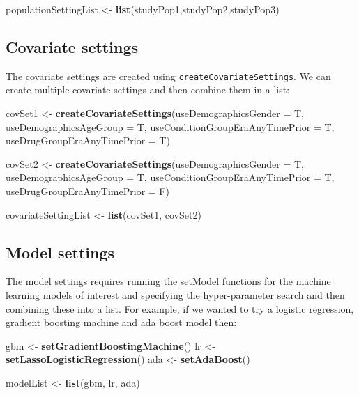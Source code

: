 \documentclass[]{article}
\newenvironment{Shaded}{\begin{snugshade}}{\end{snugshade}}
\newcommand{\KeywordTok}[1]{\textcolor[rgb]{0.13,0.29,0.53}{\textbf{#1}}}
\newcommand{\DataTypeTok}[1]{\textcolor[rgb]{0.13,0.29,0.53}{#1}}
\newcommand{\StringTok}[1]{\textcolor[rgb]{0.31,0.60,0.02}{#1}}
\newcommand{\NormalTok}[1]{#1}
\begin{document}
\begin{Shaded}
\begin{Highlighting}[]
\NormalTok{populationSettingList <-}\StringTok{ }\KeywordTok{list}\NormalTok{(studyPop1,studyPop2,studyPop3)}
\end{Highlighting}
\end{Shaded}

\subsection{Covariate settings}\label{covariate-settings}

The covariate settings are created using
\texttt{createCovariateSettings}. We can create multiple covariate
settings and then combine them in a list:

\begin{Shaded}
\begin{Highlighting}[]
\NormalTok{covSet1 <-}\StringTok{ }\KeywordTok{createCovariateSettings}\NormalTok{(}\DataTypeTok{useDemographicsGender =}\NormalTok{ T, }
                                   \DataTypeTok{useDemographicsAgeGroup =}\NormalTok{ T, }
                                   \DataTypeTok{useConditionGroupEraAnyTimePrior =}\NormalTok{ T,}
                                   \DataTypeTok{useDrugGroupEraAnyTimePrior =}\NormalTok{ T)}

\NormalTok{covSet2 <-}\StringTok{ }\KeywordTok{createCovariateSettings}\NormalTok{(}\DataTypeTok{useDemographicsGender =}\NormalTok{ T, }
                                   \DataTypeTok{useDemographicsAgeGroup =}\NormalTok{ T, }
                                   \DataTypeTok{useConditionGroupEraAnyTimePrior =}\NormalTok{ T,}
                                   \DataTypeTok{useDrugGroupEraAnyTimePrior =}\NormalTok{ F)}

\NormalTok{covariateSettingList <-}\StringTok{ }\KeywordTok{list}\NormalTok{(covSet1, covSet2)}
\end{Highlighting}
\end{Shaded}

\subsection{Model settings}\label{model-settings}

The model settings requires running the setModel functions for the
machine learning models of interest and specifying the hyper-parameter
search and then combining these into a list. For example, if we wanted
to try a logistic regression, gradient boosting machine and ada boost
model then:

\begin{Shaded}
\begin{Highlighting}[]
\NormalTok{gbm <-}\StringTok{ }\KeywordTok{setGradientBoostingMachine}\NormalTok{()}
\NormalTok{lr <-}\StringTok{ }\KeywordTok{setLassoLogisticRegression}\NormalTok{()}
\NormalTok{ada <-}\StringTok{ }\KeywordTok{setAdaBoost}\NormalTok{()}

\NormalTok{modelList <-}\StringTok{ }\KeywordTok{list}\NormalTok{(gbm, lr, ada)}
\end{Highlighting}
\end{Shaded}
\end{document}

